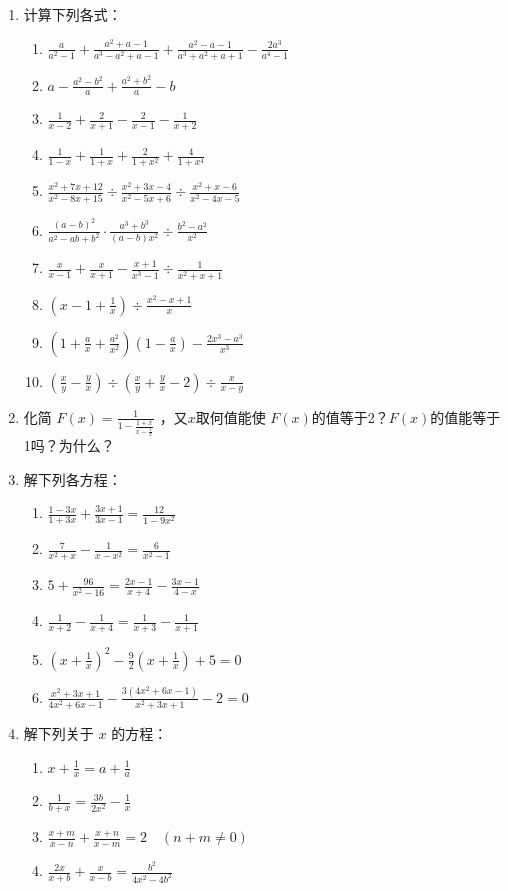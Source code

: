 \begin{enumerate}
\item 计算下列各式：
\begin{enumerate}
\item $\frac{a}{a^{2}-1}+\frac{a^{2}+ a-1}{a^{3}-a^{2}+a-1}+\frac{a^{2}-a-1}{a^{3}+a^{2}+a+1}-\frac{2 a^{3}}{a^{4}-1}$
\item  $a-\frac{a^{2}-b^{2}}{a}+\frac{a^{2}+b^{2}}{a}-b$
\item $\frac{1}{x-2}+\frac{2}{x+1}-\frac{2}{x-1}-\frac{1}{x+2}$
\item $\frac{1}{1-x}+\frac{1}{1+x}+\frac{2}{1+x^{2}}+\frac{4}{1+x^{4}}$
\item $\frac{x^{2}+7 x+12}{x^{2}-8 x+15} \div \frac{x^{2}+3 x-4}{x^{2}-5 x+6} \div \frac{x^{2}+x-6}{x^{2}-4 x-5}$
\item $\frac{(a-b)^{2}}{a^{2}-a b+b^{2}} \cdot \frac{a^{3}+b^{3}}{(a-b) x^{2}} \div \frac{b^{2}-a^{2}}{x^{2}}$
\item  $\frac{x}{x-1}+\frac{x}{x+1}-\frac{x+1}{x^{3}-1} \div \frac{1}{x^{2}+x+1}$
\item $\left(x-1+\frac{1}{x}\right)\div \frac{x^{2}-x+1}{x}$
\item $\left(1+\frac{a}{x}+\frac{a^2}{x^2}\right)\left(1-\frac{a}{x}\right)-\frac{2x^3-a^3}{x^3}$
\item $\left(\frac{x}{y}-\frac{y}{x}\right)\div \left(\frac{x}{y}+\frac{y}{x}-2\right)\div \frac{x}{x-y}$
\end{enumerate}

\item 化简 $F(x)=\frac{1}{1-\frac{1+x}{x-\frac{1}{x}}}$
，又$x$取何值能使 $F(x)$的值等于2？$F(x)$的值能等于1吗？为什么？
\item 解下列各方程：
\begin{enumerate}
\item $\frac{1-3 x}{1+3 x}+\frac{3 x+1}{3 x-1}=\frac{12}{1-9 x^{2}}$
\item $\frac{7}{x^{2}+x}-\frac{1}{x-x^{2}}=\frac{6}{x^{2}-1}$
\item $5+\frac{96}{x^{2}-16}=\frac{2 x-1}{x+4}-\frac{3 x-1}{4-x}$
\item $\frac{1}{x+2}-\frac{1}{x+4}=\frac{1}{x+3}-\frac{1}{x+1}$
\item $\left(x+\frac{1}{x}\right)^{2}-\frac{9}{2}\left(x+\frac{1}{x}\right)+5=0$
\item $\frac{x^{2}+3 x+1}{4 x^{2}+6 x-1}-\frac{3\left(4 x^{2}+6 x-1\right)}{x^{2}+3 x+1}-2=0$
\end{enumerate}

\item 解下列关于 $x$ 的方程：
\begin{enumerate}
    \item $x+\frac{1}{x}=a+\frac{1}{a}$ 
    \item $\frac{1}{b+x}=\frac{3b}{2x^2}-\frac{1}{x}$
    \item $\frac{x+m}{x-n}+\frac{x+n}{x-m}=2\quad (n+m\ne 0)$
    \item $\frac{2x}{x+b}+\frac{x}{x-b}=\frac{b^2}{4x^2-4b^2}$
\end{enumerate}


\end{enumerate}
